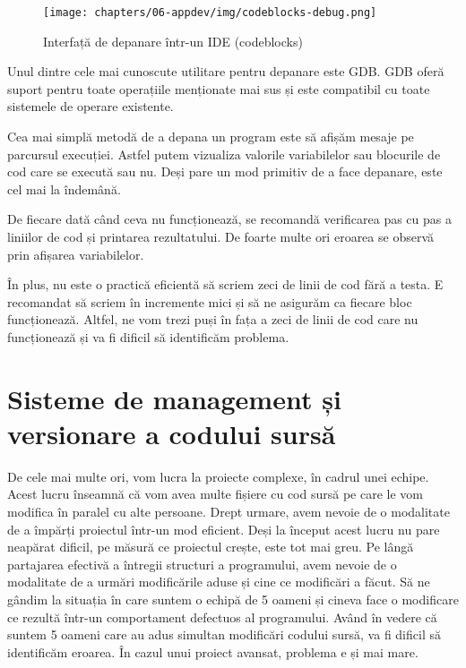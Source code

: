 \begin{figure}[!htbp]
  \centering
  \texttt{[image: chapters/06-appdev/img/codeblocks-debug.png]}
  \caption{Interfață de depanare într-un IDE (codeblocks)}
  \label{fig:appdev:ide-debug}
\end{figure}

Unul dintre cele mai cunoscute utilitare pentru depanare este GDB. GDB oferă suport pentru
toate operațiile menționate mai sus și este compatibil cu toate sistemele de
operare existente.

Cea mai simplă metodă de a depana un program este să afișăm mesaje pe parcursul
execuției. Astfel putem vizualiza valorile variabilelor sau blocurile de cod
care se execută sau nu. Deși pare un mod primitiv de a face depanare, este cel
mai la îndemână.

De fiecare dată când ceva nu funcționează, se recomandă verificarea pas cu pas a
liniilor de cod și printarea rezultatului. De foarte multe ori eroarea se
observă prin afișarea variabilelor.

În plus, nu este o practică eficientă să scriem zeci de linii de cod fără a
testa. E recomandat să scriem în incremente mici și să ne asigurăm ca fiecare
bloc funcționează. Altfel, ne vom trezi puși în fața a zeci de linii de cod care
nu funcționează și va fi dificil să identificăm problema.

\section{Sisteme de management și versionare a codului sursă}
\label{sec:appdev-versioning}

De cele mai multe ori, vom lucra la proiecte complexe, în cadrul unei echipe.
Acest lucru înseamnă că vom avea multe fișiere cu cod sursă pe care le vom modifica în
paralel cu alte persoane. Drept urmare, avem nevoie de o modalitate de a împărți
proiectul într-un mod eficient. Deși la început acest lucru nu pare neapărat
dificil, pe măsură ce proiectul crește, este tot mai greu. Pe lângă partajarea
efectivă a întregii structuri a programului, avem nevoie de o modalitate de a
urmări modificările aduse și cine ce modificări a făcut. Să ne gândim la
situația în care suntem o echipă de 5 oameni și cineva face o modificare ce
rezultă într-un comportament defectuos al programului. Având în vedere că suntem
5 oameni care au adus simultan modificări codului sursă, va fi dificil să
identificăm eroarea. În cazul unui proiect avansat, problema e și mai mare.

